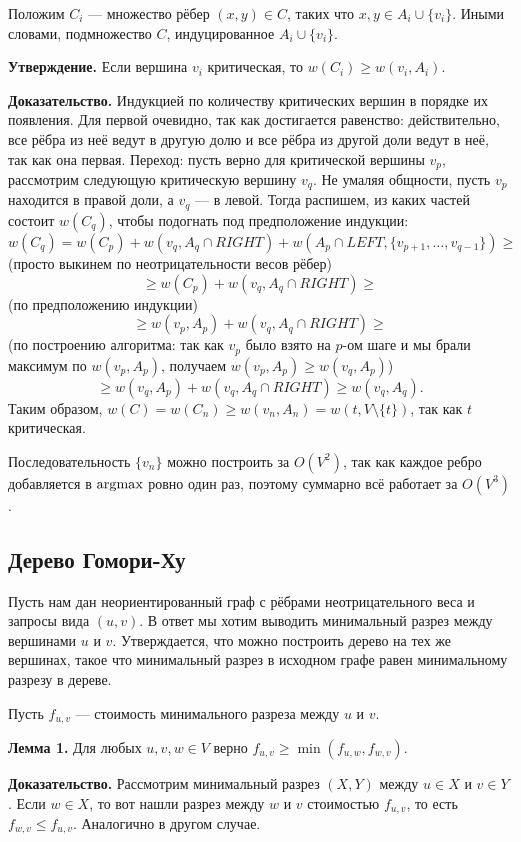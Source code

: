 Положим $C_i$ --- множество рёбер $(x, y) \in C$, таких что $x, y \in A_i \cup \{v_i\}$. Иными словами, подмножество $C$, индуцированное $A_i \cup \{v_i\}$.

\textbf{Утверждение.} Если вершина $v_i$ критическая, то $w(C_i) \ge w(v_i, A_i)$.

\textbf{Доказательство.} Индукцией по количеству критических вершин в порядке их появления.
Для первой очевидно, так как достигается равенство: действительно, все рёбра из неё ведут в другую долю и все рёбра из другой доли ведут в неё, так как она первая.
Переход: пусть верно для критической вершины $v_p$, рассмотрим следующую критическую вершину $v_q$.
Не умаляя общности, пусть $v_p$ находится в правой доли, а $v_q$ --- в левой. 
Тогда распишем, из каких частей состоит $w(C_q)$, чтобы подогнать под предположение индукции:
\[
    w(C_q) = w(C_p) + w(v_q, A_q \cap RIGHT) + w(A_p \cap LEFT, \{v_{p+1}, \dots, v_{q-1}\}) \ge
\]
(просто выкинем по неотрицательности весов рёбер)
\[
     \ge w(C_p) + w(v_q, A_q \cap RIGHT) \ge
\]
(по предположению индукции)
\[
    \ge w(v_p, A_p) + w(v_q, A_q \cap RIGHT) \ge
\]
(по построению алгоритма: так как $v_p$ было взято на $p$-ом шаге и мы брали максимум по $w(v_p, A_p)$, получаем $w(v_p, A_p) \ge w(v_q, A_p)$)
\[
    \ge w(v_q, A_p) + w(v_q, A_q \cap RIGHT) \ge w(v_q, A_q).
\]
Таким образом, $w(C) = w(C_n) \ge w(v_n, A_n) = w(t, V \setminus \{t\})$, так как $t$ критическая.

Последовательность $\{v_n\}$ можно построить за $O(V^2)$, так как каждое ребро добавляется в $\operatorname{argmax}$ ровно один раз, поэтому суммарно всё работает за $O(V^3)$.

\subsection{Дерево Гомори-Ху}
Пусть нам дан неориентированный граф с рёбрами неотрицательного веса и запросы вида $(u, v)$.
В ответ мы хотим выводить минимальный разрез между вершинами $u$ и $v$.
Утверждается, что можно построить дерево на тех же вершинах, такое что минимальный разрез в исходном графе равен минимальному разрезу в дереве.

Пусть $f_{u,v}$ --- стоимость минимального разреза между $u$ и $v$.

\textbf{Лемма 1.} Для любых $u, v, w \in V$ верно $f_{u,v} \ge \min(f_{u,w}, f_{w, v})$.

\textbf{Доказательство.} Рассмотрим минимальный разрез $(X, Y)$ между $u \in X$ и $v \in Y$.
Если $w \in X$, то вот нашли разрез между $w$ и $v$ стоимостью $f_{u,v}$, то есть $f_{w,v} \le f_{u,v}$.
Аналогично в другом случае.

